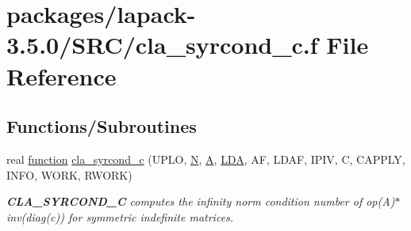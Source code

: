 \hypertarget{cla__syrcond__c_8f}{}\section{packages/lapack-\/3.5.0/\+S\+R\+C/cla\+\_\+syrcond\+\_\+c.f File Reference}
\label{cla__syrcond__c_8f}
\subsection*{Functions/\+Subroutines}
\begin{DoxyCompactItemize}
\item 
real \hyperlink{afunc_8m_a7b5e596df91eadea6c537c0825e894a7}{function} \hyperlink{group__complexSYcomputational_ga26da8d6aacbabc9792e7d456f1317238}{cla\+\_\+syrcond\+\_\+c} (U\+P\+L\+O, \hyperlink{polmisc_8c_a0240ac851181b84ac374872dc5434ee4}{N}, \hyperlink{classA}{A}, \hyperlink{example__user_8c_ae946da542ce0db94dced19b2ecefd1aa}{L\+D\+A}, A\+F, L\+D\+A\+F, I\+P\+I\+V, C, C\+A\+P\+P\+L\+Y, I\+N\+F\+O, W\+O\+R\+K, R\+W\+O\+R\+K)
\begin{DoxyCompactList}\small\item\em {\bfseries C\+L\+A\+\_\+\+S\+Y\+R\+C\+O\+N\+D\+\_\+\+C} computes the infinity norm condition number of op(\+A)$\ast$inv(diag(c)) for symmetric indefinite matrices. \end{DoxyCompactList}\end{DoxyCompactItemize}
